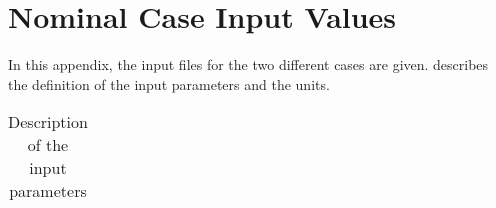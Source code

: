 \chapter{Nominal Case Input Values} 				
\label{app:appendixF-nominalCaseInputValues}

In this appendix, the input files for the two different cases are given.
 describes the definition of the input parameters and the units.




\begin{longtable}{|l|p{10cm}|}
\caption{Description of the input parameters}
\label{tab:inputFileDefinition}
\endfirsthead
\endhead
\hline


\end{longtable}
